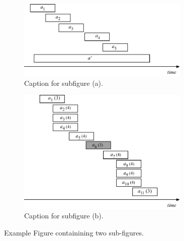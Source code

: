 \documentclass{article}
\begin{document}
\begin{figure}[htb]
\captionsetup{width = 15cm}
\centering
  \begin{subfigure}[b]{0.4\textwidth}
  \centering
  \includegraphics[width = 0.9\textwidth]{FIGURES/Example_Figure_03.pdf}
  \caption{Caption for subfigure (a).}
  \end{subfigure}
  \begin{subfigure}[b]{0.4\textwidth}
  \centering
  \includegraphics[width = 0.9\textwidth]{FIGURES/Example_Figure_04.pdf}
  \caption{Caption for subfigure (b).}
\end{subfigure}
\caption{Example Figure containining two sub-figures.}
\label{fig:Example_Figure_With_Two_Subfigures}
\end{figure}

\end{document}
